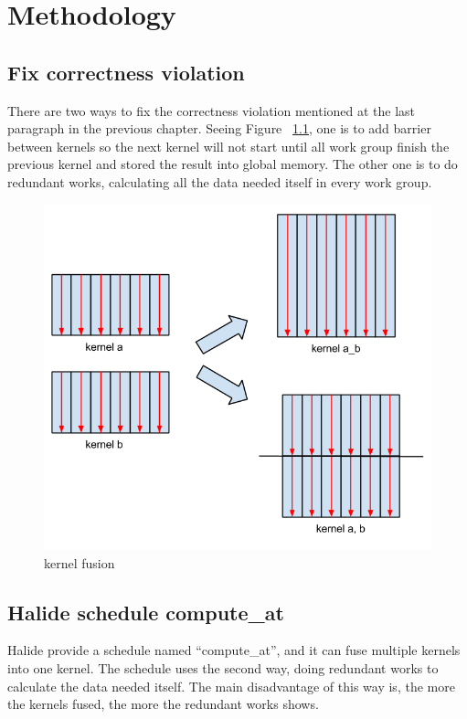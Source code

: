 \chapter{Methodology}
\section{Fix correctness violation}
    There are two ways to fix the correctness violation mentioned at the last paragraph in the previous chapter. Seeing Figure
~\ref{fig:my_label1}, one is to add barrier between kernels so the next kernel will not start until all work group finish the previous kernel and stored the result into global memory. The other one is to do redundant works, calculating all the data needed itself in every work group.

\begin{figure}[hbtp]
\centering
\includegraphics[width=15cm]{img/kernel-fusion.png}
\caption{kernel fusion}
\label{fig:my_label1}
\end{figure}

\section{Halide schedule compute\_at}
    Halide provide a schedule named “compute\_at”, and it can fuse multiple kernels into one kernel. The schedule uses the second way, doing redundant works to calculate the data needed itself. The main disadvantage of this way is, the more the kernels fused, the more the redundant works shows.


